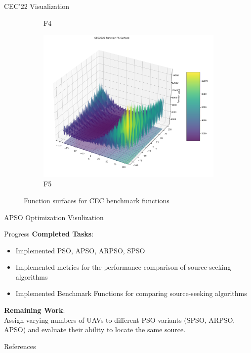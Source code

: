 \documentclass[aspectratio=169]{beamer}
\begin{document}
\begin{frame}{CEC'22 Visualization}
\begin{figure}
\begin{subfigure}[b]{0.19\textwidth}
            \caption*{F4}
        \end{subfigure}
        \hfill
        \begin{subfigure}[b]{0.19\textwidth}
            \includegraphics[width=\textwidth]{plots/cec_bench/function_surface_f5.png}
            \caption*{F5}
        \end{subfigure}
        \vspace{-1ex}
        \caption*{\scriptsize Function surfaces for CEC benchmark functions}
    \end{figure}
\end{frame}

\begin{frame}{APSO Optimization Visulization}

\end{frame}

\begin{frame}{Progress}
    \color{mypurple}\textbf{Completed Tasks}:\\
    \color{black}
    \begin{itemize}
        \item Implemented PSO, APSO, ARPSO, SPSO
        \item Implemented metrics for the performance comparison of source-seeking algorithms
        \item Implemented Benchmark Functions for comparing source-seeking algorithms
    \end{itemize}
    
    \color{mypurple}\textbf{Remaining Work}:\\
    \color{black}Assign varying numbers of UAVs to different PSO variants (SPSO, ARPSO, APSO) and evaluate their ability to locate the same source.
\end{frame}

\begin{frame}{References}
    
        
\end{frame}
\end{document}
